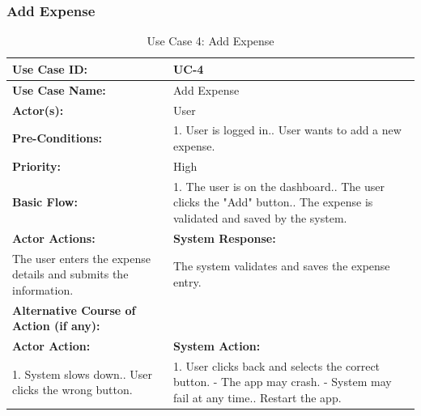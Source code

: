 \documentclass[12pt]{article}
\begin{document}
\newpage
\vspace{1 cm} %
\noindent
\subsubsection{Add Expense}
\vspace{0.5 cm}
\begin{table}[H] %
    \centering
    \begin{tabular}{|p{4cm}|p{10cm}|}
        \hline
        \textbf{Use Case ID:} & UC-4 \\ \hline
        \textbf{Use Case Name:} & Add Expense \\ \hline
        \textbf{Actor(s):} & User \\ \hline
        \textbf{Pre-Conditions:} & 
        1. User is logged in.\newline
2. User wants to add a new expense. \\ \hline
        \textbf{Priority:} & High \\ \hline
        \textbf{Basic Flow:} & 
        1. The user is on the dashboard.\newline
2. The user clicks the "Add" button.\newline
3. The expense is validated and saved by the system. \\ \hline
        \textbf{Actor Actions:} & \textbf{System Response:} \\ \hline
        The user enters the expense details and submits the information.& The system validates and saves the expense entry. \\ \hline
        \textbf{Alternative Course of Action (if any):} &  \\ \hline
        \textbf{Actor Action:} & \textbf{System Action:} \\ \hline
      1. System slows down.\newline
2. User clicks the wrong button. & 1. User clicks back and selects the correct button.\newline
- The app may crash.\newline
- System may fail at any time.\newline
1. Restart the app.\\ \hline               
    \end{tabular}
        \caption{Use Case 4: Add Expense}

\end{table}
 
\end{document}
